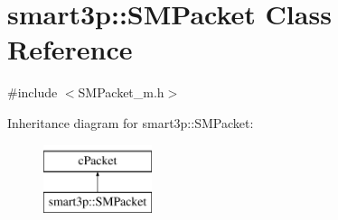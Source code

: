 \hypertarget{classsmart3p_1_1SMPacket}{}\section{smart3p\+:\+:S\+M\+Packet Class Reference}
\label{classsmart3p_1_1SMPacket}


{\ttfamily \#include $<$S\+M\+Packet\+\_\+m.\+h$>$}

Inheritance diagram for smart3p\+:\+:S\+M\+Packet\+:\begin{figure}[H]
\begin{center}
\leavevmode
\includegraphics[height=2.000000cm]{classsmart3p_1_1SMPacket}
\end{center}
\end{figure}
